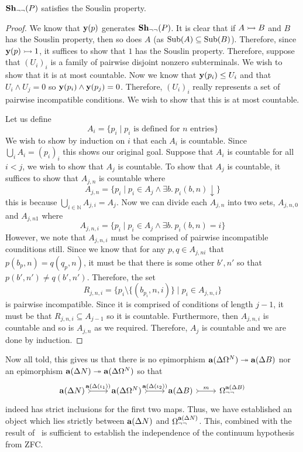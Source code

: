 \begin{lem}
  $\sheaves[\neg\neg]{P}$ satisfies the Souslin property.
\end{lem}
\begin{proof}
  We know that $\yoneda(p)$ generates $\sheaves[\neg\neg]{P}$. It is
  clear that if $A \mono B$ and $B$ has the Souslin property, then so
  does $A$ (as $\sub(A) \subseteq \sub(B)$). Therefore, since
  $\yoneda(p) \mono 1$, it suffices to show that $1$ has the Souslin
  property. Therefore, suppose that $(U_i)_i$ is a family of pairwise
  disjoint nonzero subterminals. We wish to show that it is at most
  countable. Now we know that $\yoneda(p_i) \le U_i$ and that
  $U_i \wedge U_j = 0$ so $\yoneda(p_i) \wedge \yoneda(p_j) =
  0$. Therefore, $(U_i)_i$ really represents a set of pairwise
  incompatible conditions. We wish to show that this is at most
  countable.

  Let us define
  \[
    A_i = \{p_i \mid p_i \text{ is defined for $n$ entries}\}
  \]
  We wish to show by induction on $i$ that each $A_i$ is
  countable. Since $\bigcup_i A_i = (p_i)_i$ this shows our original
  goal. Suppose that $A_i$ is countable for all $i < j$, we wish to
  show that $A_j$ is countable. To show that $A_j$ is countable, it
  suffices to show that $A_{j, n}$ is countable where
  \[
    A_{j, n} = \{p_i \mid p_i \in A_j \wedge \exists b.\ p_i(b, n) \downarrow\}
  \]
  this is because $\bigcup_{i \in \mathbb{N}} A_{j, i} = A_j$. Now we
  can divide each $A_{j, n}$ into two sets, $A_{j, n, 0}$ and $A_{j, n
    1}$ where
  \[
    A_{j, n, i } = \{p_i \mid p_i \in A_j \wedge \exists b.\ p_i(b, n) = i\}
  \]
  However, we note that  $A_{j, n, i}$ must be comprised of pairwise
  incompatible counditions still. Since we know that for any $p, q \in
  A_{j, n i}$ that $p(b_p, n) = q(q_p, n)$, it must be that there is
  some other $b', n'$ so that $p(b', n') \neq q(b', n')$. Therefore,
  the set
  \[
    R_{j, n, i } = \{p_i \setminus \{(b_{p_i}, n, i)\} \mid p_i \in A_{j, n, i}\}
  \]
  is pairwise incompatible. Since it is comprised of conditions of
  length $j - 1$, it must be that $R_{j, n, i} \subseteq A_{j - 1}$ so
  it is countable. Furthermore, then $A_{j, n, i}$ is countable and so
  is $A_{j, n}$ as we required. Therefore, $A_j$ is countable and we
  are done by induction.
\end{proof}
Now all told, this gives us that there is no epimorphism
$\sheafify(\Delta \Omega^N) \epi \sheafify(\Delta B)$ nor an
epimorphism $\sheafify(\Delta N) \epi \sheafify(\Delta \Omega^N)$ so
that
\[
  \begin{tikzcd}
    \sheafify(\Delta N) \ar[r, rightarrowtail, "\sheafify(\Delta(\iota_1))"] &
    \sheafify(\Delta \Omega^N) \ar[r, rightarrowtail, "\sheafify(\Delta(\iota_2))"] &
    \sheafify(\Delta B) \ar[r, rightarrowtail, "m"] &
    \Omega_{\neg\neg}^{\sheafify(\Delta B)}
  \end{tikzcd}
\]
indeed has strict inclusions for the first two maps. Thus, we have
established an object which lies strictly between
$\sheafify(\Delta N)$ and $\Omega_{\neg\neg}^{\sheafify(\Delta N)}$.
This, combined with the result of~\citet{Fourman:80} is sufficient to
establish the independence of the continuum hypothesis from ZFC.
